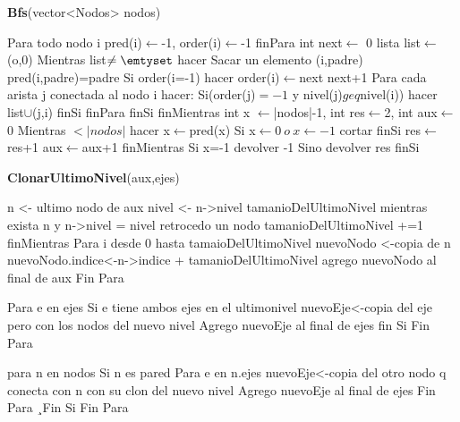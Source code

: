\documentclass[spanish,12pt]{article}
\begin{document}
\begin{algorithm}[H]{\textbf{Bfs}(vector<Nodos> nodos)}
	\begin{algorithmic}[1]
		\State \quad Para todo nodo i
			\State \quad \quad  pred(i)$\gets$-1, order(i)$\gets$-1
		\State \quad finPara
		\State \quad int next$\gets$ 0
		\State \quad lista list$\gets${(o,0)}
		\State \quad Mientras list$\neq \emtyset$ hacer
			\State \quad \quad Sacar un elemento (i,padre)
			\State \quad \quad pred(i,padre)=padre
			\State \quad \quad Si order(i=-1) hacer
				\State \quad \quad \quad order(i)$\gets$next
				\State \quad \quad \quad next+1
				\State \quad \quad \quad Para cada arista j conectada al nodo i hacer:
					\State \quad \quad \quad \quad Si(order(j)$=-1$ y nivel(j)$geq$nivel(i)) hacer
						 \State \quad \quad \quad \quad \quad list$\cup${(j,i)}
					\State \quad \quad \quad \quad finSi
				\State \quad \quad \quad   finPara
			\State \quad \quad  finSi
		\State \quad finMientras
		\State \quad int x $\gets$|nodos|-1, int res$\gets$2, int aux$\gets$0
		\State \quad Mientras $< |nodos|$ hacer
			\State \quad \quad  x$\gets$pred(x)
			\State \quad \quad Si x$\gets0 \ o \ x\gets-1$ cortar finSi
			\State \quad \quad res$\gets$res+1
			\State \quad \quad aux$\gets$aux+1
		\State \quad finMientras
		\State \quad Si x=-1
			\State \quad \quad devolver -1
		\State \quad Sino
			\State \quad \quad  devolver res
		\State \quad finSi




	\end{algorithmic}
\end{algorithm}

\begin{algorithm}[H]{\textbf{ClonarUltimoNivel}(aux,ejes)}
	\begin{algorithmic}[1]
		\State n <- ultimo nodo  de aux
		\State nivel <- n->nivel
		\State tamanioDelUltimoNivel
		\State mientras exista n  y n->nivel = nivel 
			\State retrocedo un nodo
			\State tamanioDelUltimoNivel +=1
		\State finMientras
		\State Para i desde 0 hasta tamaioDelUltimoNivel
		  \State nuevoNodo <-copia de n
			\State nuevoNodo.indice<-n->indice + tamanioDelUltimoNivel
			\State agrego nuevoNodo al final de  aux
		\State Fin Para

		\State Para e en ejes
		 \State Si e tiene ambos ejes en el ultimonivel
		 	\State nuevoEje<-copia del eje pero con los nodos del nuevo nivel
		  \State Agrego nuevoEje al final de ejes
		 \State fin Si
		 \State Fin Para

		\State para n en nodos
		  \State Si n es pared
				\State Para e en n.ejes
				\State nuevoEje<-copia del otro nodo q conecta con n con su clon del nuevo nivel
				\State Agrego nuevoEje al final de ejes
				\State Fin Para
			\State¸Fin Si
		\State Fin Para
	\end{algorithmic}
\end{algorithm}
\end{document}
